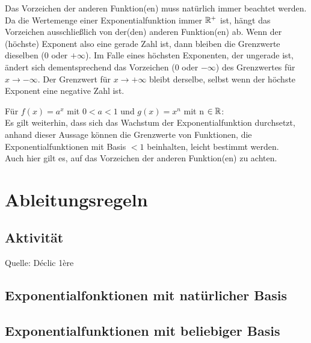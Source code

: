 \begin{itemize}
\begin{Bemerkung}
\danger Das Vorzeichen der anderen Funktion(en) muss natürlich immer beachtet werden.\\
Da die Wertemenge einer Exponentialfunktion immer $\mathbb{R}^+$ ist, hängt das Vorzeichen ausschließlich von der(den) anderen Funktion(en) ab. Wenn der (höchste) Exponent also eine gerade Zahl ist, dann bleiben die Grenzwerte dieselben ($0$ oder $+\infty$). Im Falle eines höchsten Exponenten, der ungerade ist, ändert sich dementsprechend das Vorzeichen ($0$ oder $-\infty$) des Grenzwertes für $x\to -\infty$. Der Grenzwert für $x\to+\infty$ bleibt derselbe, selbst wenn der höchste Exponent eine negative Zahl ist.
\end{Bemerkung}

Für $f(x)= a^x$ mit $0<a<1$ und $g(x)=x^n$ mit n $\in \mathbb{R}$:\\
Es gilt weiterhin, dass sich das Wachstum der Exponentialfunktion durchsetzt, anhand dieser Aussage können die Grenzwerte von Funktionen, die Exponentialfunktionen mit Basis $<1$ beinhalten, leicht bestimmt werden.\\
\danger Auch hier gilt es, auf das Vorzeichen der anderen Funktion(en) zu achten.

\end{itemize}		


	


		\section{Ableitungsregeln}

	\subsection{Aktivität}

Quelle: Déclic 1ère

	\subsection{Exponentialfonktionen mit natürlicher Basis}

	\subsection{Exponentialfunktionen mit beliebiger Basis}

